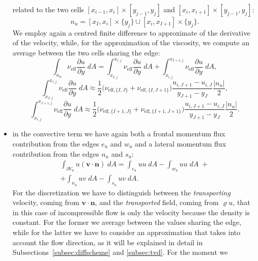 \begin{itemize}
	related to the two cells $[x_{i-1},x_i]\times[y_{j-1},y_j]$ and 
	$[x_i,x_{i+1}]\times[y_{j-1},y_j]$:
	\begin{equation}
	n_u = [x_I,x_i]\times \{y_j\} \cup [x_i,x_{I+1}] \times \{y_j\}.
	\end{equation}
	We employ again a centred finite difference to approximate of the 
	derivative of the velocity, while, for the approximation of the viscosity, 
	we compute an average between the two cells sharing the edge:
	\begin{equation}
	\int_{n_u} \nu_\text{eff} \frac{\partial u}{\partial y} \; dA = 
	\int_{x_{I,j}}^{x_{i,j}} \nu_\text{eff} \frac{\partial u}{\partial y} \; dA 
	+\int_{x_{i,j}}^{x_{I+1,j}} \nu_\text{eff} \frac{\partial u}{\partial y} \; 
	dA,
	\end{equation}
	\begin{equation*}
	\int_{x_{I,j}}^{x_{i,j}} \nu_\text{eff} \frac{\partial u}{\partial y} \; dA 
	\approx \frac{1}{2}\big(\nu_{\text{eff},\{I,J\}}+\nu_{\text{eff},\{I,J+1\}} 
	\big) \frac{u_{i,J+1}-u_{i,J}}{y_{J+1}-y_J} \frac{|n_u|}{2},
	\end{equation*}
	\begin{equation*}
	\int_{x_{i,j}}^{x_{I+1,j}} \nu_\text{eff} \frac{\partial u}{\partial y} \; 
	dA \approx \frac{1}{2}\big( \nu_{\text{eff},\{I+1,J\}}+ 
	\nu_{\text{eff},\{I+1,J+1\}} \big) \frac{u_{i,J+1}-u_{i,J}}{y_{J+1}-y_J} 
	\frac{|n_u|}{2}.
	\end{equation*}
	\item in the convective term we have again both a frontal momentum flux 
	contribution from the edges $e_u$ and $w_u$ and a lateral momentum flux 
	contribution from the edges $n_u$ and $s_u$:
	\begin{multline}
	\int_{\partial V_u} u (\mathbf{v} \cdot \mathbf{n}) \; dA = \int_{e_u} u u 
	\; dA - \int_{w_u} u u \; dA \; +\\
	+ \int_{n_u} u v \; dA  -\int_{s_u} u v \; dA.
	\end{multline}
	For the discretization we have to distinguish between the 
	\emph{transporting} velocity, coming from $\mathbf{v} \cdot \mathbf{n}$, 
	and the \emph{transported} field, coming from $\varrho u$, that in this 
	case of incompressible flow is only the velocity because the density is 
	constant. For the former we average between the values sharing the edge, 
	while for the latter we have to consider an approximation that takes into 
	account the flow direction, as it will be explained in detail in 
	Subsections~\ref{subsec:diffscheme} and \ref{subsec:tvd}. For the moment we 

\end{itemize}
